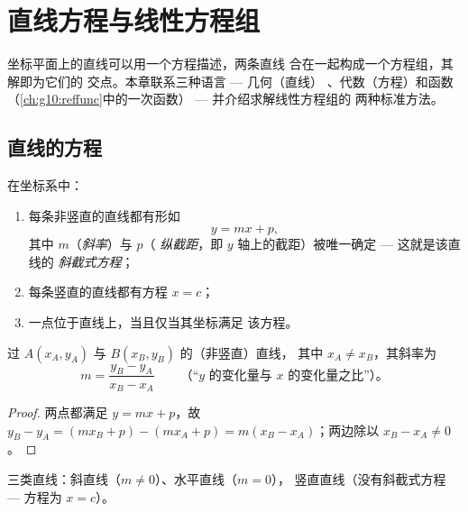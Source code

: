 \chapter{直线方程与线性方程组}\label{ch:g10:lines}

坐标平面上的直线可以用一个方程描述，两条直线
合在一起构成一个方程组，其解即为它们的
交点。本章联系三种语言 --- 几何（直线）
、代数（方程）和函数（\cref{ch:g10:reffunc}中的一次函数）
--- 并介绍求解线性方程组的
两种标准方法。

\section{直线的方程}

\begin{theorem}[斜截式方程]\label{thm:g10:lines:reduced}
在坐标系中：
\begin{enumerate}
  \item 每条非竖直的直线都有形如
        \[
        y = mx + p ,
        \]
        其中 $m$（\emph{斜率}）与 $p$（
        \emph{纵截距}，即 $y$ 轴上的截距）被唯一确定 --- 这就是该直线的
        \emph{斜截式方程}；
  \item 每条竖直的直线都有方程 $x = c$；
  \item 一点位于直线上，当且仅当其坐标满足
        该方程。
\end{enumerate}
\end{theorem}
\admitted

\begin{proposition}[过两点的斜率]\label{prop:g10:lines:slope}
过 $A(x_A, y_A)$ 与 $B(x_B, y_B)$ 的（非竖直）直线，
其中 $x_A \neq x_B$，其斜率为
\[
m = \frac{y_B - y_A}{x_B - x_A}
\qquad
\text{（“$y$ 的变化量与 $x$ 的变化量之比”）。}
\]
\end{proposition}

\begin{proof}
两点都满足 $y = mx + p$，故 $y_B - y_A = (mx_B + p) - (mx_A + p)
= m(x_B - x_A)$；两边除以 $x_B - x_A \neq 0$。
\end{proof}

\begin{omfigure}

{\small 三类直线：斜直线（$m \neq 0$）、水平直线（$m = 0$），
竖直直线（没有斜截式方程 --- 方程为 $x = c$）。}
\end{omfigure}

